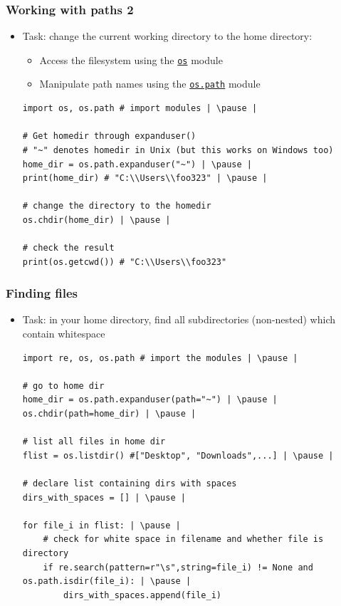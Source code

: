 \documentclass[xcolor=table]{beamer}
\begin{document}
\begin{frame}[fragile]
    \frametitle{Working with paths 2}
    \begin{itemize}
        \item Task: change the current working directory to the home directory: \pause
    \begin{itemize}
            \item Access the filesystem using the \href{https://docs.python.org/3.7/library/os.html#module-os}{\texttt{os}} module 
            \item Manipulate path names using the \href{https://docs.python.org/3.7/library/os.path.html}{\texttt{os.path}} module \pause
    \end{itemize}
\begin{lstlisting}[style=python]
import os, os.path # import modules | \pause |

# Get homedir through expanduser()
# "~" denotes homedir in Unix (but this works on Windows too)
home_dir = os.path.expanduser("~") | \pause |
print(home_dir) # "C:\\Users\\foo323" | \pause |

# change the directory to the homedir
os.chdir(home_dir) | \pause |

# check the result
print(os.getcwd()) # "C:\\Users\\foo323"
\end{lstlisting}
    \end{itemize}
\end{frame}

\begin{frame}[fragile]
    \frametitle{Finding files}
    \begin{itemize}
        \item Task: in your home directory, find all subdirectories (non-nested) which contain whitespace
\begin{lstlisting}[style=python]
import re, os, os.path # import the modules | \pause |

# go to home dir
home_dir = os.path.expanduser(path="~") | \pause |
os.chdir(path=home_dir) | \pause |

# list all files in home dir
flist = os.listdir() #["Desktop", "Downloads",...] | \pause |

# declare list containing dirs with spaces
dirs_with_spaces = [] | \pause |

for file_i in flist: | \pause |
    # check for white space in filename and whether file is directory
    if re.search(pattern=r"\s",string=file_i) != None and os.path.isdir(file_i): | \pause |
        dirs_with_spaces.append(file_i)
\end{lstlisting} \pause
    \end{itemize}
\end{frame}
\end{document}
